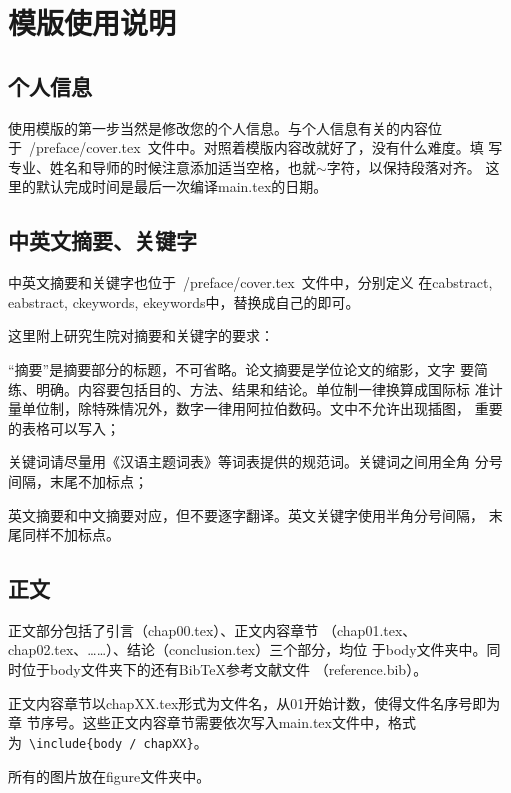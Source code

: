 
\chapter{模版使用说明}
\label{chap01}

\section{个人信息}
使用模版的第一步当然是修改您的个人信息。与个人信息有关的内容位
于~{/preface/cover.tex}~文件中。对照着模版内容改就好了，没有什么难度。填
写专业、姓名和导师的时候注意添加适当空格，也就$\sim$字符，以保持段落对齐。
这里的默认完成时间是最后一次编译main.tex的日期。

\section{中英文摘要、关键字}
中英文摘要和关键字也位于~{/preface/cover.tex}~文件中，分别定义
在cabstract, eabstract, ckeywords, ekeywords中，替换成自己的即可。

这里附上研究生院对摘要和关键字的要求：
\begin{asparaenum}
\item “摘要”是摘要部分的标题，不可省略。论文摘要是学位论文的缩影，文字
  要简练、明确。内容要包括目的、方法、结果和结论。单位制一律换算成国际标
  准计量单位制，除特殊情况外，数字一律用阿拉伯数码。文中不允许出现插图，
  重要的表格可以写入；
\item 关键词请尽量用《汉语主题词表》等词表提供的规范词。关键词之间用全角
  分号间隔，末尾不加标点；
\item 英文摘要和中文摘要对应，但不要逐字翻译。英文关键字使用半角分号间隔，
  末尾同样不加标点。
\end{asparaenum}

\section{正文}
正文部分包括了引言（chap00.tex）、正文内容章节
（chap01.tex、chap02.tex、……）、结论（conclusion.tex）三个部分，均位
于body文件夹中。同时位于body文件夹下的还有Bib\TeX{}参考文献文件
（reference.bib）。

正文内容章节以chapXX.tex形式为文件名，从01开始计数，使得文件名序号即为章
节序号。这些正文内容章节需要依次写入main.tex文件中，格式
为~\texttt{\footnotesize \textbackslash include\{body / chapXX\}}。

所有的图片放在figure文件夹中。

